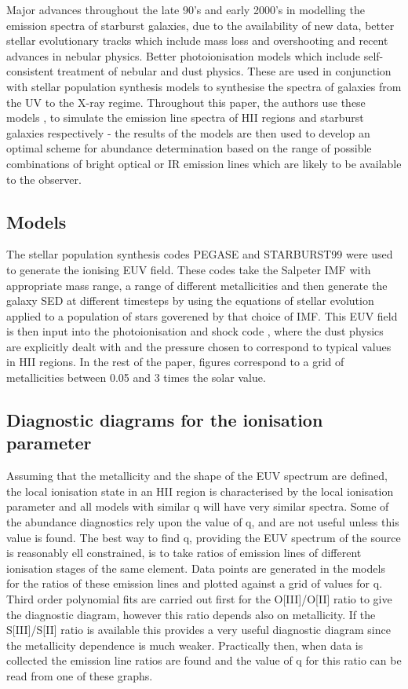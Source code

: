 \documentclass{literature}
\begin{document}
Major advances throughout the late 90's and early 2000's in modelling the emission spectra of starburst galaxies, due to the availability of new data, better stellar evolutionary tracks which include mass loss and overshooting and recent advances in nebular physics. Better photoionisation models which include self-consistent treatment of nebular and dust physics. These are used in conjunction with stellar population synthesis models to synthesise the spectra of galaxies from the UV to the X-ray regime. Throughout this paper, the authors use these models \citep{Dopita_2000}, \citep{Kewley_2001} to simulate the emission line spectra of HII regions and starburst galaxies respectively - the results of the models are then used to develop an optimal scheme for abundance determination based on the range of possible combinations of bright optical or IR emission lines which are likely to be available to the observer. \\

\subsection{Models}
The stellar population synthesis codes PEGASE \citep{Fioc_1997} and STARBURST99 \citep{Leitherer_1999} were used to generate the ionising EUV field. These codes take the Salpeter IMF with appropriate mass range, a range of different metallicities and then generate the galaxy SED at different timesteps by using the equations of stellar evolution applied to a population of stars goverened by that choice of IMF. This EUV field is then input into the photoionisation and shock code \citep{Sutherland_1993}, where the dust physics are explicitly dealt with and the pressure chosen to correspond to typical values in HII regions. In the rest of the paper, figures correspond to a grid of metallicities between 0.05 and 3 times the solar value.

\subsection{Diagnostic diagrams for the ionisation parameter}
Assuming that the metallicity and the shape of the EUV spectrum are defined, the local ionisation state in an HII region is characterised by the local ionisation parameter and all models with similar q will have very similar spectra. Some of the abundance diagnostics rely upon the value of q, and are not useful unless this value is found. The best way to find q, providing the EUV spectrum of the source is reasonably ell constrained, is to take ratios of emission lines of different ionisation stages of the same element. Data points are generated in the models for the ratios of these emission lines and plotted against a grid of values for q. Third order polynomial fits are carried out first for the O[III]/O[II] ratio to give the diagnostic diagram, however this ratio depends also on metallicity. If the S[III]/S[II] ratio is available this provides a very useful diagnostic diagram since the metallicity dependence is much weaker. Practically then, when data is collected the emission line ratios are found and the value of q for this ratio can be read from one of these graphs.
\end{document}
